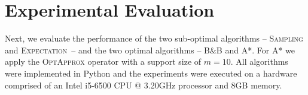 \documentclass[letterpaper]{article} %
\newcommand{\samd}{\ac{SAMD}\xspace}
\newcommand{\astar}{\textsc{A*}\xspace}
\newcommand{\sampling}{\textsc{Sampling}\xspace}
\newcommand{\expectation}{\textsc{Expectation}\xspace}
\newcommand{\bnb}{\textsc{B\&B}\xspace}
\newcommand{\optapprox}{\textsc{OptApprox}\xspace}
\newcommand\Tal[1]{\nb{\textbf{Tal:}}{green}{#1}}
\begin{document}
\section{Experimental Evaluation}
\label{sec:exp}

Next, we evaluate the performance of the two sub-optimal algorithms -- \sampling and \expectation~-- and the two optimal algorithms -- \bnb and \astar. For \astar we apply the \optapprox operator with a support size of $m=10$. All algorithms were implemented in Python and the experiments were executed on a hardware comprised of an Intel i5-6500 CPU @ 3.20GHz processor and 8GB memory.

\end{document}
